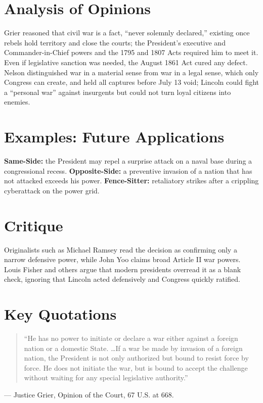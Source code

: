 \documentclass[12pt]{article}
\begin{document}
\section{Analysis of Opinions}
Grier reasoned that civil war is a fact, ``never solemnly declared,'' existing once rebels hold territory and close the courts; the President's executive and Commander-in-Chief powers and the 1795 and 1807 Acts required him to meet it. Even if legislative sanction was needed, the August 1861 Act cured any defect. Nelson distinguished war in a material sense from war in a legal sense, which only Congress can create, and held all captures before July 13 void; Lincoln could fight a ``personal war'' against insurgents but could not turn loyal citizens into enemies.

\section{Examples: Future Applications}
\textbf{Same-Side:} the President may repel a surprise attack on a naval base during a congressional recess. \textbf{Opposite-Side:} a preventive invasion of a nation that has not attacked exceeds his power. \textbf{Fence-Sitter:} retaliatory strikes after a crippling cyberattack on the power grid.

\section{Critique}
Originalists such as Michael Ramsey read the decision as confirming only a narrow defensive power, while John Yoo claims broad Article II war powers. Louis Fisher and others argue that modern presidents overread it as a blank check, ignoring that Lincoln acted defensively and Congress quickly ratified.

\section{Key Quotations}
\begin{quote}
``He has no power to initiate or declare a war either against a foreign nation or a domestic State. \ldots If a war be made by invasion of a foreign nation, the President is not only authorized but bound to resist force by force. He does not initiate the war, but is bound to accept the challenge without waiting for any special legislative authority.''
\end{quote}
\noindent --- Justice Grier, Opinion of the Court, 67 U.S. at 668.
\end{document}
